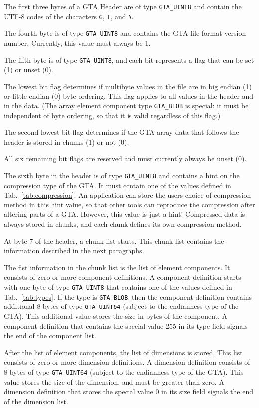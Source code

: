 \documentclass[a4paper,11pt]{article}
\newcommand{\code}[1]{\texttt{#1}}
\begin{document}
The first three bytes of a GTA Header are of type \code{GTA\_UINT8} and contain
the \mbox{UTF-8} codes of the characters \code{G}, \code{T}, and \code{A}.

The fourth byte is of type \code{GTA\_UINT8} and contains the GTA file format
version number. Currently, this value must always be 1.

The fifth byte is of type \code{GTA\_UINT8}, and each bit represents a flag that
can be set (1) or unset (0).

The lowest bit flag determines if multibyte values in the file are in big endian
(1) or little endian (0) byte ordering. This flag applies to all values in the
header and in the data. (The array element component type \code{GTA\_BLOB} is special:
it must be independent of byte ordering, so that it is valid regardless of this
flag.)

The second lowest bit flag determines if the GTA array data that follows the header 
is stored in chunks (1) or not (0).

All six remaining bit flags are reserved and must currently always be unset (0).

The sixth byte in the header is of type \code{GTA\_UINT8} and contains a hint on
the compression type of the GTA. It must contain one of the values defined in
Tab.~\ref{tab:compression}.  An application can store the users choice of
compression method in this hint value, so that other tools can reproduce the
compression after altering parts of a GTA. However, this value is just a hint!
Compressed data is always stored in chunks, and each chunk defines its own
compression method.

At byte 7 of the header, a chunk list starts. This chunk list contains the
information described in the next paragraphs.

The fist information in the chunk list is the list of element components. It
consists of zero or more component definitions. A component definition starts
with one byte of type \code{GTA\_UINT8} that contains one of the values
defined in Tab.~\ref{tab:types}. If the type is \code{GTA\_BLOB}, then the
component definition contains additional 8 bytes of type \code{GTA\_UINT64}
(subject to the endianness type of the GTA). This additional value stores the
size in bytes of the component. A component definition that contains the
special value 255 in its type field signals the end of the component list.

After the list of element components, the list of dimensions is stored.  This
list consists of zero or more dimension definitions. A dimension definition
consists of 8 bytes of type \code{GTA\_UINT64} (subject to the endianness type
of the GTA). This value stores the size of the dimension, and must be greater
than zero. A dimension definition that stores the special value 0 in its size
field signals the end of the dimension list.
\end{document}
